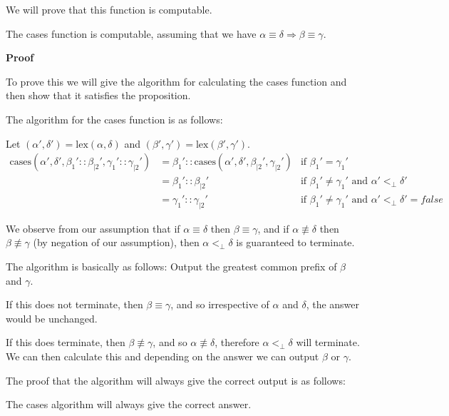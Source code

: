 \documentclass{cs4rep}
\begin{document}
We will prove that this function is computable.

\begin{myprop}
  The cases function is computable, assuming that we have $\alpha
  \equiv \delta \Rightarrow \beta \equiv \gamma$.
\end{myprop}

{\bf Proof}

To prove this we will give the algorithm for calculating the cases
function and then show that it satisfies the proposition.

The algorithm for the cases function is as follows:

Let $(\alpha',\delta')=\mbox{lex}(\alpha,\delta)$ and $(\beta',\gamma') = \mbox{lex}(\beta',\gamma').$
\[ \begin{array}{lll}
\mbox{cases}(\alpha',\delta',\beta_{1}'::\beta_{|2}',\gamma_{1}'::\gamma_{|2}') & = \beta_{1}'::\mbox{cases}(\alpha',\delta',\beta_{|2}',\gamma_{|2}') & \mbox{if } \beta_{1}' = \gamma_{1}' \\
&  = \beta_{1}'::\beta_{|2}' & \mbox{if } \beta_{1}' \neq \gamma_{1}' \mbox{ and } \alpha' <_{\perp} \delta' \\
& = \gamma_{1}'::\gamma_{|2}' & \mbox{if } \beta_{1}' \neq \gamma_{1}' \mbox{ and } \alpha' <_{\perp} \delta' = false
\end{array} \]

We observe from our assumption that if $\alpha \equiv \delta$ then
$\beta \equiv \gamma$, and if $\alpha \not\equiv \delta$ then $\beta
\not\equiv \gamma$ (by negation of our assumption), then $\alpha
<_{\perp} \delta$ is guaranteed to terminate.

The algorithm is basically as follows:
Output the greatest common prefix of $\beta$ and $\gamma$.

If this does not terminate, then $\beta \equiv \gamma$, and so
irrespective of $\alpha$ and $\delta$, the answer would be unchanged.

If this does terminate, then $\beta \not\equiv \gamma$, and so $\alpha
\not\equiv \delta$, therefore $\alpha <_{\perp} \delta$ will
terminate. We can then calculate this and depending on the answer we
can output $\beta$ or $\gamma$.

The proof that the algorithm will always give the correct output is as
follows:

\begin{myprop}
The cases algorithm will always give the correct answer.
\end{myprop}
\end{document}
